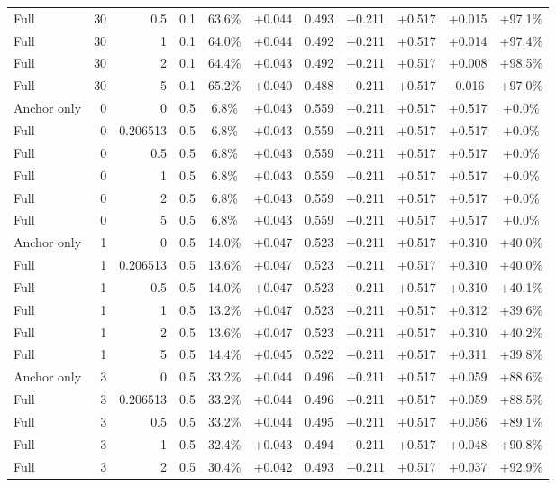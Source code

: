 \begin{table}[htbp]
\begin{tabular}{lrrrccccccc}
Full & 30 & 0.5 & 0.1 & 63.6\% & +0.044 & 0.493 & +0.211 & +0.517 & +0.015 & +97.1\% \\
Full & 30 & 1 & 0.1 & 64.0\% & +0.044 & 0.492 & +0.211 & +0.517 & +0.014 & +97.4\% \\
Full & 30 & 2 & 0.1 & 64.4\% & +0.043 & 0.492 & +0.211 & +0.517 & +0.008 & +98.5\% \\
Full & 30 & 5 & 0.1 & 65.2\% & +0.040 & 0.488 & +0.211 & +0.517 & -0.016 & +97.0\% \\
Anchor only & 0 & 0 & 0.5 & 6.8\% & +0.043 & 0.559 & +0.211 & +0.517 & +0.517 & +0.0\% \\
Full & 0 & 0.206513 & 0.5 & 6.8\% & +0.043 & 0.559 & +0.211 & +0.517 & +0.517 & +0.0\% \\
Full & 0 & 0.5 & 0.5 & 6.8\% & +0.043 & 0.559 & +0.211 & +0.517 & +0.517 & +0.0\% \\
Full & 0 & 1 & 0.5 & 6.8\% & +0.043 & 0.559 & +0.211 & +0.517 & +0.517 & +0.0\% \\
Full & 0 & 2 & 0.5 & 6.8\% & +0.043 & 0.559 & +0.211 & +0.517 & +0.517 & +0.0\% \\
Full & 0 & 5 & 0.5 & 6.8\% & +0.043 & 0.559 & +0.211 & +0.517 & +0.517 & +0.0\% \\
Anchor only & 1 & 0 & 0.5 & 14.0\% & +0.047 & 0.523 & +0.211 & +0.517 & +0.310 & +40.0\% \\
Full & 1 & 0.206513 & 0.5 & 13.6\% & +0.047 & 0.523 & +0.211 & +0.517 & +0.310 & +40.0\% \\
Full & 1 & 0.5 & 0.5 & 14.0\% & +0.047 & 0.523 & +0.211 & +0.517 & +0.310 & +40.1\% \\
Full & 1 & 1 & 0.5 & 13.2\% & +0.047 & 0.523 & +0.211 & +0.517 & +0.312 & +39.6\% \\
Full & 1 & 2 & 0.5 & 13.6\% & +0.047 & 0.523 & +0.211 & +0.517 & +0.310 & +40.2\% \\
Full & 1 & 5 & 0.5 & 14.4\% & +0.045 & 0.522 & +0.211 & +0.517 & +0.311 & +39.8\% \\
Anchor only & 3 & 0 & 0.5 & 33.2\% & +0.044 & 0.496 & +0.211 & +0.517 & +0.059 & +88.6\% \\
Full & 3 & 0.206513 & 0.5 & 33.2\% & +0.044 & 0.496 & +0.211 & +0.517 & +0.059 & +88.5\% \\
Full & 3 & 0.5 & 0.5 & 33.2\% & +0.044 & 0.495 & +0.211 & +0.517 & +0.056 & +89.1\% \\
Full & 3 & 1 & 0.5 & 32.4\% & +0.043 & 0.494 & +0.211 & +0.517 & +0.048 & +90.8\% \\
Full & 3 & 2 & 0.5 & 30.4\% & +0.042 & 0.493 & +0.211 & +0.517 & +0.037 & +92.9\% \\

\end{tabular}
\end{table}
